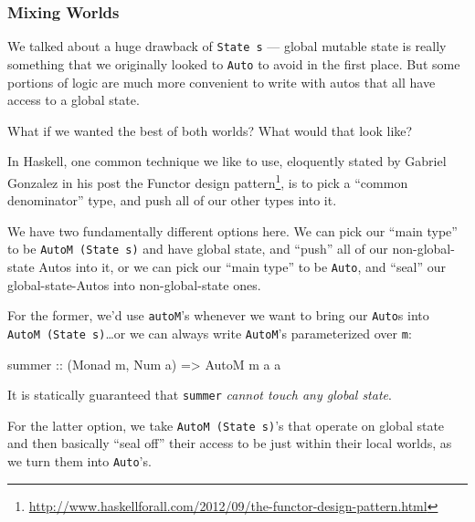 \documentclass[]{article}
\newenvironment{Shaded}{}{}
\newcommand{\DataTypeTok}[1]{\textcolor[rgb]{0.56,0.13,0.00}{#1}}
\newcommand{\NormalTok}[1]{#1}
\newcommand{\OtherTok}[1]{\textcolor[rgb]{0.00,0.44,0.13}{#1}}
\renewcommand{\href}[2]{#2\footnote{\url{#1}}}
\begin{document}
\hypertarget{mixing-worlds}{%
\subsubsection{Mixing Worlds}\label{mixing-worlds}}

We talked about a huge drawback of \texttt{State\ s} --- global mutable state is
really something that we originally looked to \texttt{Auto} to avoid in the
first place. But some portions of logic are much more convenient to write with
autos that all have access to a global state.

What if we wanted the best of both worlds? What would that look like?

In Haskell, one common technique we like to use, eloquently stated by Gabriel
Gonzalez in his post
\href{http://www.haskellforall.com/2012/09/the-functor-design-pattern.html}{the
Functor design pattern}, is to pick a ``common denominator'' type, and push all
of our other types into it.

We have two fundamentally different options here. We can pick our ``main type''
to be \texttt{AutoM\ (State\ s)} and have global state, and ``push'' all of our
non-global-state Autos into it, or we can pick our ``main type'' to be
\texttt{Auto}, and ``seal'' our global-state-Autos into non-global-state ones.

For the former, we'd use \texttt{autoM}'s whenever we want to bring our
\texttt{Auto}s into \texttt{AutoM\ (State\ s)}\ldots or we can always write
\texttt{AutoM}'s parameterized over \texttt{m}:

\begin{Shaded}
\begin{Highlighting}[]
\OtherTok{summer ::}\NormalTok{ (}\DataTypeTok{Monad}\NormalTok{ m, }\DataTypeTok{Num}\NormalTok{ a) }\OtherTok{=>} \DataTypeTok{AutoM}\NormalTok{ m a a}
\end{Highlighting}
\end{Shaded}

It is statically guaranteed that \texttt{summer} \emph{cannot touch any global
state}.

For the latter option, we take \texttt{AutoM\ (State\ s)}'s that operate on
global state and then basically ``seal off'' their access to be just within
their local worlds, as we turn them into \texttt{Auto}'s.
\end{document}
